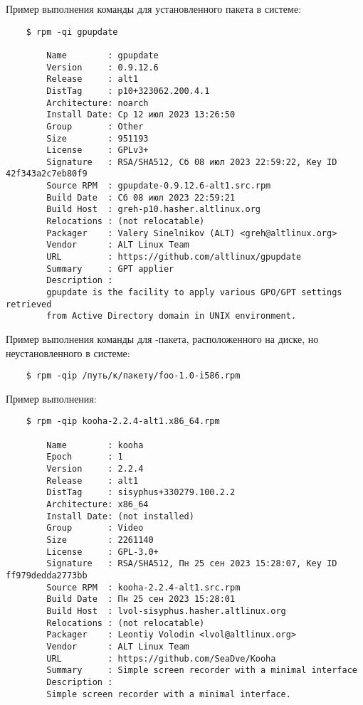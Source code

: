 


Пример выполнения команды для установленного пакета в системе:
\begin{verbatim}
    $ rpm -qi gpupdate

        Name        : gpupdate
        Version     : 0.9.12.6
        Release     : alt1
        DistTag     : p10+323062.200.4.1
        Architecture: noarch
        Install Date: Ср 12 июл 2023 13:26:50
        Group       : Other
        Size        : 951193
        License     : GPLv3+
        Signature   : RSA/SHA512, Сб 08 июл 2023 22:59:22, Key ID 42f343a2c7eb80f9
        Source RPM  : gpupdate-0.9.12.6-alt1.src.rpm
        Build Date  : Сб 08 июл 2023 22:59:21
        Build Host  : greh-p10.hasher.altlinux.org
        Relocations : (not relocatable)
        Packager    : Valery Sinelnikov (ALT) <greh@altlinux.org>
        Vendor      : ALT Linux Team
        URL         : https://github.com/altlinux/gpupdate
        Summary     : GPT applier
        Description :
        gpupdate is the facility to apply various GPO/GPT settings retrieved
        from Active Directory domain in UNIX environment.
\end{verbatim}

Пример выполнения команды для -пакета, расположенного на диске, но неустановленного в системе:
\begin{verbatim}
    $ rpm -qip /путь/к/пакету/foo-1.0-i586.rpm
\end{verbatim}

Пример выполнения:
\begin{verbatim}
    $ rpm -qip kooha-2.2.4-alt1.x86_64.rpm

        Name        : kooha
        Epoch       : 1
        Version     : 2.2.4
        Release     : alt1
        DistTag     : sisyphus+330279.100.2.2
        Architecture: x86_64
        Install Date: (not installed)
        Group       : Video
        Size        : 2261140
        License     : GPL-3.0+
        Signature   : RSA/SHA512, Пн 25 сен 2023 15:28:07, Key ID ff979dedda2773bb
        Source RPM  : kooha-2.2.4-alt1.src.rpm
        Build Date  : Пн 25 сен 2023 15:28:01
        Build Host  : lvol-sisyphus.hasher.altlinux.org
        Relocations : (not relocatable)
        Packager    : Leontiy Volodin <lvol@altlinux.org>
        Vendor      : ALT Linux Team
        URL         : https://github.com/SeaDve/Kooha
        Summary     : Simple screen recorder with a minimal interface
        Description :
        Simple screen recorder with a minimal interface.
\end{verbatim}

